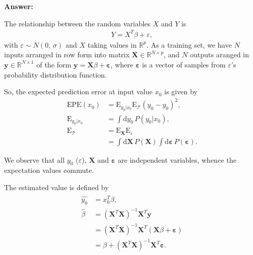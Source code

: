 \documentclass{article}
\begin{document}
\textbf{Answer:}

The relationship between the random variables $X$ and $Y$ is
\begin{align}
	Y=X^T\beta+\varepsilon,
\end{align}
with $\varepsilon\sim N(0,\,\sigma)$ and $X$ taking values in $\mathbb R^p$. As a training set, we have $N$ inputs arranged in row form into matrix $\mathbf X\in\mathbb R^{N\times p}$, and $N$ outputs aranged in $\mathbf y\in\mathbb R^{N\times1}$ of the form $\mathbf y=\mathbf X\beta+\pmb\varepsilon$, where $\pmb\varepsilon$ is a vector of samples from $\varepsilon$'s probability distribution function.

So, the expected prediction error at input value $x_0$ is given by
\begin{align}
	\mathrm{EPE}(x_0)&=\mathrm E_{y_0|x_0}\mathrm E_{\mathcal T}\left(y_0-\hat{y_0}\right)^2,\\
	\mathrm E_{y_0|x_0}&=\int\mathrm dy_0\,P(y_0|x_0),\\
	\mathrm E_{\mathcal T}&=\mathrm E_{\mathbf X}\mathrm E_{\varepsilon}\\
	&=\int\mathrm d\mathbf X\,P(\mathbf X)\int\mathrm d\pmb\varepsilon\,P(\pmb\varepsilon).
\end{align}

We observe that all $y_0$ ($\varepsilon$), $\mathbf X$ and $\pmb\varepsilon$ are independent variables, whence the expectation values commute.

The estimated value is defined by
\begin{align}
	\hat{y_0}&=x_0^T\hat{\beta},\\
	\hat{\beta}&=(\mathbf X^T\mathbf X)^{-1}\mathbf X^T\mathbf y\\
	&=(\mathbf X^T\mathbf X)^{-1}\mathbf X^T\left(\mathbf X\beta+\pmb\varepsilon\right)\\
	&=\beta+\left(\mathbf X^T\mathbf X\right)^{-1}\mathbf X^T\pmb\varepsilon.
\end{align}
\end{document}
